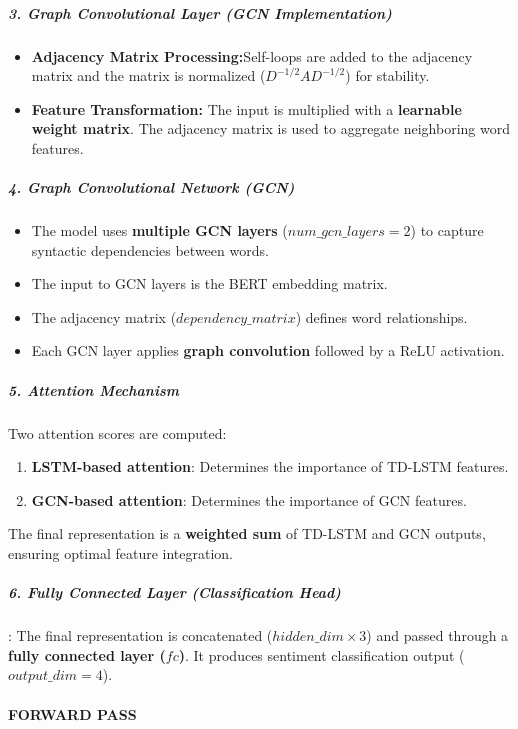 \documentclass{article}
\begin{document}
\subparagraph{3. Graph Convolutional Layer (GCN Implementation)}
\begin{itemize}
    \item \textbf{Adjacency Matrix Processing:}Self-loops are added to the adjacency matrix and the  matrix is normalized ($D^{-1/2} A D^{-1/2}$) for stability.
    \item \textbf{Feature Transformation:} The input is multiplied with a \textbf{learnable weight matrix}. The adjacency matrix is used to aggregate neighboring word features.

\end{itemize}
\subparagraph{4. Graph Convolutional Network (GCN)}
\begin{itemize}
    \item The model uses \textbf{multiple GCN layers} ($num\_gcn\_layers=2$) to capture syntactic dependencies between words.
    \item The input to GCN layers is the BERT embedding matrix.
    \item The adjacency matrix ($dependency\_matrix$) defines word relationships.
    \item Each GCN layer applies \textbf{graph convolution} followed by a ReLU activation.
\end{itemize}

\subparagraph{5. Attention Mechanism}
Two attention scores are computed:
\begin{enumerate}
    \item \textbf{LSTM-based attention}: Determines the importance of TD-LSTM features.
    \item \textbf{GCN-based attention}: Determines the importance of GCN features.
\end{enumerate}
The final representation is a \textbf{weighted sum} of TD-LSTM and GCN outputs, ensuring optimal feature integration.

\subparagraph{6. Fully Connected Layer (Classification Head)}: The final representation is concatenated ($hidden\_dim \times 3$) and passed through a \textbf{fully connected layer ($fc$)}. It produces sentiment classification output ($output\_dim=4$).

\paragraph{FORWARD PASS}
\end{document}

